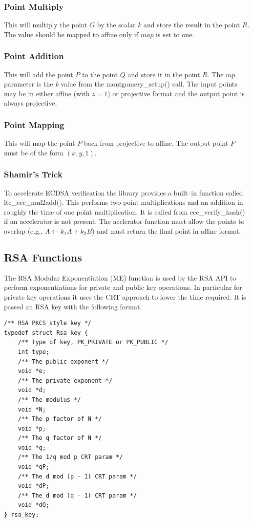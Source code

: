 \documentclass[synpaper]{book}
\begin{document}
\subsubsection{Point Multiply}
This will multiply the point $G$ by the scalar $k$ and store the result in the point $R$.  The value should be mapped to affine only if $map$ is set to one.

\subsubsection{Point Addition}
This will add the point $P$ to the point $Q$ and store it in the point $R$.  The $mp$ parameter is the \textit{b} value from the montgomery\_setup() call.  The input points
may be in either affine (with $z = 1$) or projective format and the output point is always projective.

\subsubsection{Point Mapping}
This will map the point $P$ back from projective to affine.  The output point $P$ must be of the form $(x, y, 1)$.

\subsubsection{Shamir's Trick}
To accelerate ECDSA verification the library provides a built--in function called ltc\_ecc\_mul2add().  This performs two point multiplications and an addition in
roughly the time of one point multiplication.  It is called from ecc\_verify\_hash() if an accelerator is not present.  The acclerator function must allow the points to
overlap (e.g., $A \leftarrow k_1A + k_2B$) and must return the final point in affine format.


\subsection{RSA Functions}
The RSA Modular Exponentiation (ME) function is used by the RSA API to perform exponentiations for private and public key operations.  In particular for
private key operations it uses the CRT approach to lower the time required.  It is passed an RSA key with the following format.

\begin{verbatim}
/** RSA PKCS style key */
typedef struct Rsa_key {
    /** Type of key, PK_PRIVATE or PK_PUBLIC */
    int type;
    /** The public exponent */
    void *e;
    /** The private exponent */
    void *d;
    /** The modulus */
    void *N;
    /** The p factor of N */
    void *p;
    /** The q factor of N */
    void *q;
    /** The 1/q mod p CRT param */
    void *qP;
    /** The d mod (p - 1) CRT param */
    void *dP;
    /** The d mod (q - 1) CRT param */
    void *dQ;
} rsa_key;
\end{verbatim}
\end{document}
